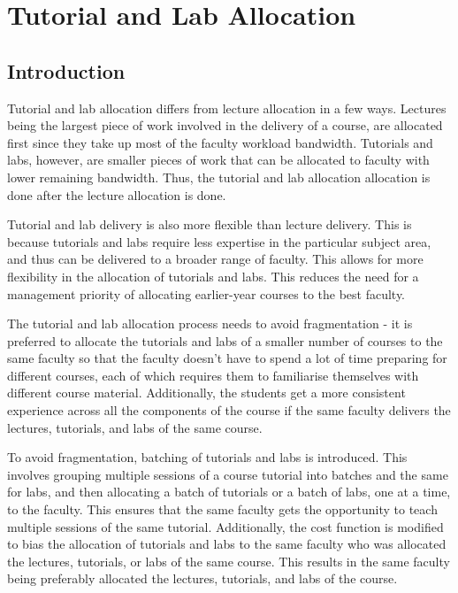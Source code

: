 \chapter{Tutorial and Lab Allocation}

\section{Introduction}

Tutorial and lab allocation differs from lecture allocation in a few ways. Lectures being the largest piece of work involved in the delivery of a course, are allocated first since they take up most of the faculty workload bandwidth. Tutorials and labs, however, are smaller pieces of work that can be allocated to faculty with lower remaining bandwidth. Thus, the tutorial and lab allocation allocation is done after the lecture allocation is done.

Tutorial and lab delivery is also more flexible than lecture delivery. This is because tutorials and labs require less expertise in the particular subject area, and thus can be delivered to a broader range of faculty. This allows for more flexibility in the allocation of tutorials and labs. This reduces the need for a management priority of allocating earlier-year courses to the best faculty.

The tutorial and lab allocation process needs to avoid fragmentation - it is preferred to allocate the tutorials and labs of a smaller number of courses to the same faculty so that the faculty doesn't have to spend a lot of time preparing for different courses, each of which requires them to familiarise themselves with different course material. Additionally, the students get a more consistent experience across all the components of the course if the same faculty delivers the lectures, tutorials, and labs of the same course.

To avoid fragmentation, batching of tutorials and labs is introduced. This involves grouping multiple sessions of a course tutorial into batches and the same for labs, and then allocating a batch of tutorials or a batch of labs, one at a time, to the faculty. This ensures that the same faculty gets the opportunity to teach multiple sessions of the same tutorial. Additionally, the cost function is modified to bias the allocation of tutorials and labs to the same faculty who was allocated the lectures, tutorials, or labs of the same course. This results in the same faculty being preferably allocated the lectures, tutorials, and labs of the course.

